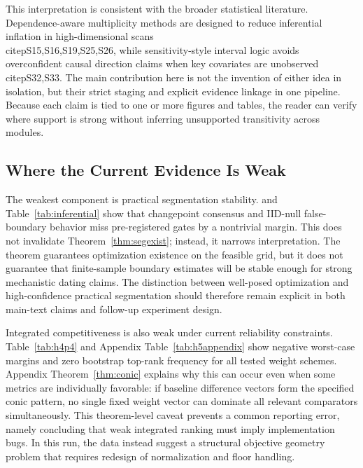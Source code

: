 \documentclass{article} %
\begin{document}
This interpretation is consistent with the broader statistical literature. Dependence-aware multiplicity methods are designed to reduce inferential inflation in high-dimensional scans \\citep{S15,S16,S19,S25,S26}, while sensitivity-style interval logic avoids overconfident causal direction claims when key covariates are unobserved \\citep{S32,S33}. The main contribution here is not the invention of either idea in isolation, but their strict staging and explicit evidence linkage in one pipeline. Because each claim is tied to one or more figures and tables, the reader can verify where support is strong without inferring unsupported transitivity across modules.

\subsection{Where the Current Evidence Is Weak}
The weakest component is practical segmentation stability.  and Table~\ref{tab:inferential} show that changepoint consensus and IID-null false-boundary behavior miss pre-registered gates by a nontrivial margin. This does not invalidate Theorem~\ref{thm:segexist}; instead, it narrows interpretation. The theorem guarantees optimization existence on the feasible grid, but it does not guarantee that finite-sample boundary estimates will be stable enough for strong mechanistic dating claims. The distinction between well-posed optimization and high-confidence practical segmentation should therefore remain explicit in both main-text claims and follow-up experiment design.

Integrated competitiveness is also weak under current reliability constraints. Table~\ref{tab:h4p4} and Appendix Table~\ref{tab:h5appendix} show negative worst-case margins and zero bootstrap top-rank frequency for all tested weight schemes. Appendix Theorem~\ref{thm:conic} explains why this can occur even when some metrics are individually favorable: if baseline difference vectors form the specified conic pattern, no single fixed weight vector can dominate all relevant comparators simultaneously. This theorem-level caveat prevents a common reporting error, namely concluding that weak integrated ranking must imply implementation bugs. In this run, the data instead suggest a structural objective geometry problem that requires redesign of normalization and floor handling.
\end{document}
